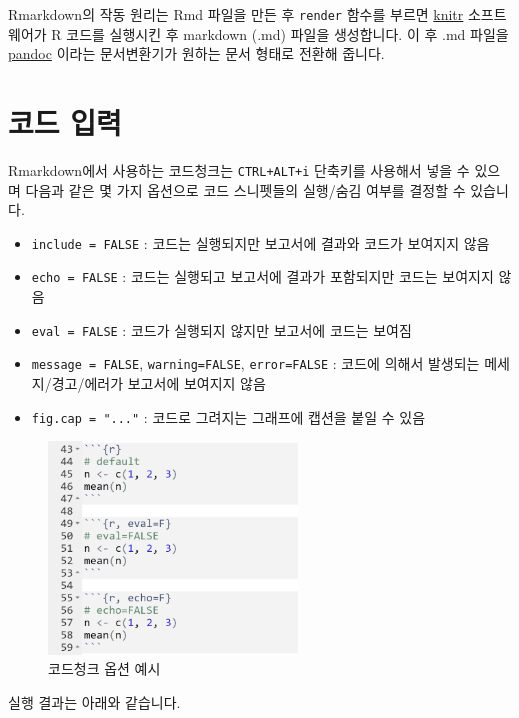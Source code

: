 \documentclass[
]{book}
\providecommand{\tightlist}{%
  \setlength{\itemsep}{0pt}\setlength{\parskip}{0pt}}
\begin{document}
Rmarkdown의 작동 원리는 Rmd 파일을 만든 후 \texttt{render} 함수를 부르면 \href{https://yihui.org/knitr/}{knitr} 소프트웨어가 R 코드를 실행시킨 후 markdown (.md) 파일을 생성합니다. 이 후 .md 파일을 \href{https://pandoc.org/}{pandoc} 이라는 문서변환기가 원하는 문서 형태로 전환해 줍니다.

\hypertarget{uxcf54uxb4dc-uxc785uxb825}{%
\section{코드 입력}\label{uxcf54uxb4dc-uxc785uxb825}}

Rmarkdown에서 사용하는 코드청크는 \texttt{CTRL+ALT+i} 단축키를 사용해서 넣을 수 있으며 다음과 같은 몇 가지 옵션으로 코드 스니펫들의 실행/숨김 여부를 결정할 수 있습니다.

\begin{itemize}
\tightlist
\item
  \texttt{include\ =\ FALSE} : 코드는 실행되지만 보고서에 결과와 코드가 보여지지 않음
\item
  \texttt{echo\ =\ FALSE} : 코드는 실행되고 보고서에 결과가 포함되지만 코드는 보여지지 않음
\item
  \texttt{eval\ =\ FALSE} : 코드가 실행되지 않지만 보고서에 코드는 보여짐
\item
  \texttt{message\ =\ FALSE}, \texttt{warning=FALSE}, \texttt{error=FALSE} : 코드에 의해서 발생되는 메세지/경고/에러가 보고서에 보여지지 않음
\item
  \texttt{fig.cap\ =\ "..."} : 코드로 그려지는 그래프에 캡션을 붙일 수 있음
\end{itemize}

\begin{figure}
\centering
\includegraphics[width=2.60417in,height=\textheight]{images/rmarkdown/codechunk1.PNG}
\caption{코드청크 옵션 예시}
\end{figure}

실행 결과는 아래와 같습니다.
\end{document}
